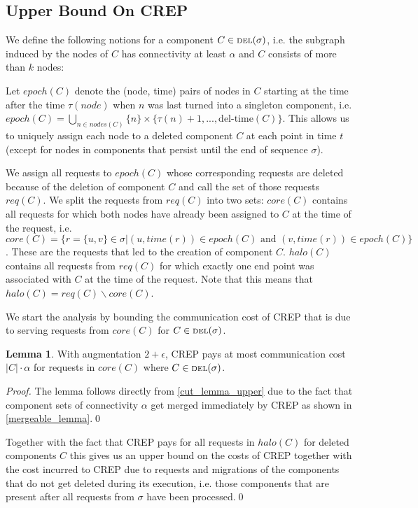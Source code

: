\documentclass[xcolor=dvipsnames, tikz, 12pt]{article}
\newcommand{\nl}{\newline}
\newcommand{\crep}{C{\scriptsize REP}}
\newcommand{\del}{\text{\scriptsize DEL}}
\theoremstyle{definition}
\newtheorem{lemma}[defi]{Lemma}
\begin{document}
\subsection{Upper Bound On \crep{}}

We define the following notions for a component $C\in\del{}(\sigma)$, i.e. the subgraph induced by the nodes of $C$ has connectivity at least $\alpha$ and $C$ consists of more than $k$ nodes:

Let $epoch(C)$ denote the (node, time) pairs of nodes in $C$ starting at the time after the time $\tau(node)$ when $n$ was last turned into a singleton component, i.e. $epoch(C)=\bigcup_{n\in nodes(C)}\{n\}\times\{\tau(n)+1,...,\text{del-time}(C)\}$. This allows us to uniquely assign each node to a deleted component $C$ at each point in time $t$ (except for nodes in components that persist until the end of sequence $\sigma$).

We assign all requests to $epoch(C)$ whose corresponding requests are deleted because of the deletion of component $C$ and call the set of those requests $req(C)$.
We split the requests from $req(C)$ into two sets: $core(C)$ contains all requests for which both nodes have already been assigned to $C$ at the time of the request, i.e. $core(C)=\{r=\{u,v\}\in\sigma| (u,time(r))\in epoch(C)\text{ and } (v, time(r))\in epoch(C)\}$. These are the requests that led to the creation of component $C$. 
$halo(C)$ contains all requests from $req(C)$ for which exactly one end point was associated with $C$ at the time of the request. Note that this means that $halo(C)=req(C)\backslash core(C)$.

We start the analysis by bounding the communication cost of \crep{} that is due to serving requests from $core(C)$ for $C\in\del{}(\sigma)$.

\begin{lemma}
	\label{core_comm_upper}
	With augmentation $2+\epsilon$, \crep{} pays at most communication cost $|C|\cdot\alpha$ for requests in $core(C)$ where $C\in\del{}(\sigma)$.
\end{lemma}

\textit{Proof.} The lemma follows directly from \cref{cut_lemma_upper} due to the fact that component sets of connectivity $\alpha$ get merged immediately by \crep{} as shown in \cref{mergeable_lemma}.\qed\nl

Together with the fact that \crep{} pays for all requests in $halo(C)$ for deleted components $C$ this gives us  an upper bound on the costs of \crep{} together with the cost incurred to \crep{} due to requests and migrations of the components that do not get deleted during its execution, i.e. those components that are present after all requests from $\sigma$ have been processed.\qed\nl
\end{document}
